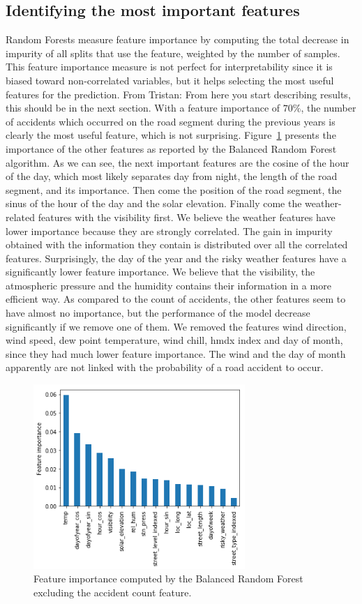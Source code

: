 \documentclass[conference]{IEEEtran}
\newcommand{\TG}[1]{\colorlet{saved}{.}\color{orange}From Tristan: #1\color{saved}}
\begin{document}
\subsection{Identifying the most important features}

Random Forests measure feature importance by computing the total
decrease in impurity of all splits that use the feature, weighted by the
number of samples. This feature importance measure is not perfect for
interpretability since it is biased toward non-correlated variables, but it
helps selecting the most useful features for the prediction. \TG{From here
you start describing results, this should be in the next section.} With a
feature importance of $70\%$, the number of accidents which occurred on the
road
segment during the previous years is clearly the most useful feature, which
is not surprising. Figure~\ref{feature importances} presents the
importance of the other features as reported by the Balanced Random Forest
algorithm. As we can see, the next important features are the cosine of
the hour of the day, which most likely separates day from night, the length of
the road segment, and its importance. Then come the position of the road
segment, the sinus of the hour of the day and the solar elevation. Finally
come the weather-related features with the visibility first. We believe the
weather features have lower importance because they are strongly
correlated. The gain in impurity obtained with the information they contain
is distributed over all the correlated features. Surprisingly, the day of
the year and the risky weather features have a significantly lower feature
importance. We believe that the visibility, the atmospheric pressure and the
humidity contains their information in a more efficient way. As compared to
the count of accidents, the other features seem to have almost no
importance, but the performance of the model decrease significantly if we
remove one of them. We removed the features wind direction, wind speed, dew
point temperature, wind chill, hmdx index and day of month, since they had
much lower feature importance. The wind and the day of month apparently
are not linked with the probability of a road accident to occur.


\begin{figure}[htbp]
\centerline{\includegraphics[height=7cm, keepaspectratio]{figures/brf_fi_nocount.png}}
\caption{Feature importance computed by the Balanced Random Forest excluding the accident count feature.}
\label{feature importances}
\end{figure}
\end{document}
